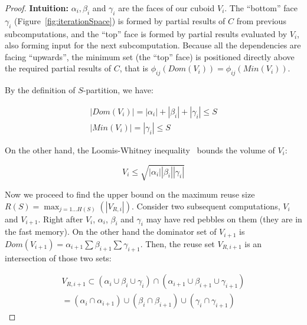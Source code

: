 \documentclass[sigplan,review,anonymous]{acmart}\settopmatter{printfolios=true,printccs=false,printacmref=false}
\newcommand\mac[1]{\textcolor{red}{[Mac: #1]}}
\begin{document}
\begin{proof}
\textbf{Intuition:}  $\alpha_i, \beta_i$ and
$\gamma_i$ are the faces of our cuboid $V_i$. The ``bottom'' face $\gamma_i$
(Figure~\ref{fig:iterationSpace}) is formed by partial results of $C$ from
previous subcomputations, and the ``top'' face is formed by partial results
evaluated by $V_i$, also forming input for
the next subcomputation. Because all the dependencies are facing ``upwards'', 
the minimum set (the ``top'' face) is positioned directly above the required 
partial results of $C$, that is $\phi_{ij}(Dom(V_i)) = \phi_{ij}(Min(V_i))$.

By the definition of $S$-partition, we have:

\begin{gather}
\label{eq:dm}
|Dom(V_i)| = |\alpha_i| + |\beta_i| + |\gamma_i| \le S \\
\nonumber
|Min(V_i)| = |\gamma_i| \le S
\end{gather}



On the other hand, the Loomis-Whitney
inequality~\cite{loomisWhitney} bounds the volume of $V_i$: 

\begin{equation}
\label{eq:lm}
V_i \le \sqrt{|\alpha_i| |\beta_i| |\gamma_i|}
\end{equation}



Now we proceed to find the upper bound on the maximum reuse size $R(S) = 
\max_{j = 1 \dots
H(S)}(|V_{R,i}|)$. Consider two subsequent computations, $V_i$ and $V_{i+1}$.
Right after $V_i$, $\alpha_i$, $\beta_i$ and $\gamma_i$ may have red pebbles on 
them (they are in the fast memory). On the other hand the dominator set of 
$V_{i+1}$ is $Dom(V_{i+1}) = \alpha_{i+1} \sum \beta_{i+1} \sum \gamma_{i+1}$.
Then, the reuse set $V_{R,i+1}$ is an intersection of those two sets:

\begin{gather}
\nonumber
V_{R,i+1}
 \subset (\alpha_i \cup \beta_i \cup \gamma_i) \cap (\alpha_{i+1} 
\cup 
\beta_{i+1} \cup \gamma_{i+1}) \\
\label{eq:vri1}
= (\alpha_i \cap \alpha_{i+1}) \cup ( 
\beta_i \cap 
\beta_{i+1}) \cup (\gamma_i \cap \gamma_{i+1})
\end{gather}


\end{proof}
\end{document}
